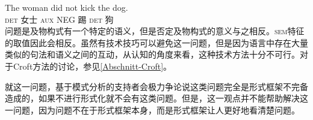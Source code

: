 \ea
\gll The woman did not kick the dog.\\
    \textsc{det} 女士 \textsc{aux} NEG 踢 \textsc{det} 狗\\
\z
问题是及物构式有一个特定的语义，但是否定及物构式的意义与之相反。\textsc{sem}特征的取值因此会相反。虽然有技术技巧可以避免这一问题，但是因为语言中存在大量类似的句法和语义之间的互动，从认知的角度来看，这种技术方法十分不可行\citep{Mueller2006d,Mueller2007d,MuellerLehrbuch1,MuellerPersian,MWArgSt}。对于Croft方法的讨论，参见\ref{Abschnitt-Croft}。

就这一问题，基于模式分析的支持者会极力争论说这类问题完全是形式框架不完备造成的，如果不进行形式化就不会有这类问题\citep[\S~5]{Goldberg2009a}。但是，这一观点并不能帮助解决这一问题，因为问题不在于形式框架本身，而是形式框架让人更好地看清楚问题。

